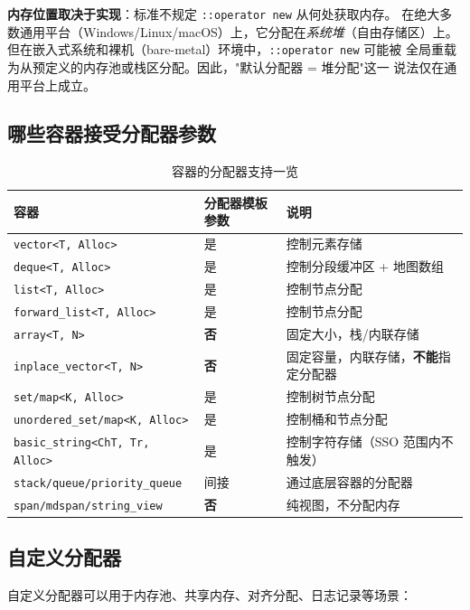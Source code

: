 \documentclass[12pt,a4paper,fontset=fandol]{ctexbook}
\newcommand{\Tp}[1]{\texttt{#1}}
\begin{document}
\begin{note}
\textbf{内存位置取决于实现}：标准不规定 \texttt{::operator new} 从何处获取内存。
在绝大多数通用平台（Windows/Linux/macOS）上，它分配在\emph{系统堆}（自由存储区）上。
但在嵌入式系统和裸机（bare-metal）环境中，\texttt{::operator new} 可能被
全局重载为从预定义的内存池或栈区分配。因此，"默认分配器 = 堆分配"这一
说法仅在通用平台上成立。
\end{note}

\subsection{哪些容器接受分配器参数}

\begin{table}[htbp]
\centering
\caption{容器的分配器支持一览}
\begin{tabularx}{\textwidth}{l l X}
\toprule
\textbf{容器} & \textbf{分配器模板参数} & \textbf{说明} \\
\midrule
\Tp{vector<T, Alloc>}           & 是 & 控制元素存储 \\
\Tp{deque<T, Alloc>}            & 是 & 控制分段缓冲区 + 地图数组 \\
\Tp{list<T, Alloc>}             & 是 & 控制节点分配 \\
\Tp{forward\_list<T, Alloc>}    & 是 & 控制节点分配 \\
\Tp{array<T, N>}                & \textbf{否} & 固定大小，栈/内联存储 \\
\Tp{inplace\_vector<T, N>}      & \textbf{否} & 固定容量，内联存储，\textbf{不能}指定分配器 \\
\Tp{set/map<K, Alloc>}          & 是 & 控制树节点分配 \\
\Tp{unordered\_set/map<K, Alloc>}& 是 & 控制桶和节点分配 \\
\Tp{basic\_string<ChT, Tr, Alloc>}& 是 & 控制字符存储（SSO 范围内不触发） \\
\Tp{stack/queue/priority\_queue} & 间接 & 通过底层容器的分配器 \\
\Tp{span/mdspan/string\_view}   & \textbf{否} & 纯视图，不分配内存 \\
\bottomrule
\end{tabularx}
\end{table}

\subsection{自定义分配器}

自定义分配器可以用于内存池、共享内存、对齐分配、日志记录等场景：
\end{document}
